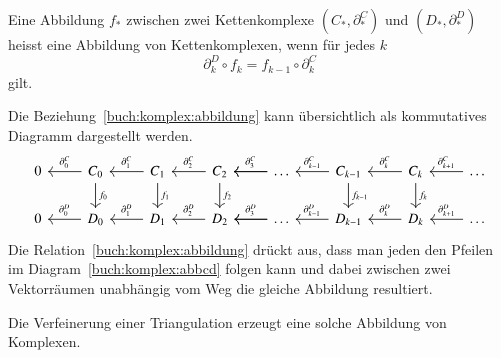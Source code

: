 \begin{definition}
Eine Abbildung $f_*$ zwischen zwei Kettenkomplexe $(C_*,\partial^C_*)$ und 
$(D_*,\partial^D_*)$ heisst eine Abbildung von Kettenkomplexen, wenn
für jedes $k$ 
\begin{equation}
\partial^D_k
\circ
f_{k}
=
f_{k-1}
\circ
\partial^C_k
\label{buch:komplex:abbildung}
\end{equation}
gilt.
\end{definition}

Die Beziehung~\eqref{buch:komplex:abbildung} kann übersichtlich als
kommutatives Diagramm dargestellt werden.
\begin{equation}
\begin{tikzcd}
0 
	& C_0 \arrow[l, "\partial_0^C" above]
		\arrow[d, "f_0"]
		& C_1 \arrow[l,"\partial_1^C" above]
			\arrow[d, "f_1"]
			& C_2 \arrow[l,"\partial_2^C" above]
				\arrow[d, "f_2"]
				& \dots \arrow[l]
					\arrow[l, "\partial_{3}^C" above]
					& C_{k-1}
						\arrow[l, "\partial_{k-1}^C" above]
						\arrow[d, "f_{k-1}"]
						& C_{k}\arrow[l, "\partial_{k}^C" above]
							\arrow[d, "f_{k}"]
							& \dots
								\arrow[l,"\partial_{k+1}^C" above]
\\
0 
	& D_0 \arrow[l, "\partial_0^D" above]
		& D_1 \arrow[l,"\partial_1^D" above]
			& D_2 \arrow[l,"\partial_2^D" above]
				& \dots \arrow[l]
					\arrow[l, "\partial_{3}^D" above]
					& D_{k-1}
						\arrow[l, "\partial_{k-1}^D" above]
						& D_{k}\arrow[l, "\partial_{k}^D" above]
							& \dots
								\arrow[l,"\partial_{k+1}^D" above]
\end{tikzcd}
\label{buch:komplex:abbcd}
\end{equation}
Die Relation~\eqref{buch:komplex:abbildung} drückt aus, dass man jeden
den Pfeilen im Diagram~\eqref{buch:komplex:abbcd} folgen kann und
dabei zwischen zwei Vektorräumen unabhängig vom Weg die gleiche Abbildung
resultiert.

Die Verfeinerung einer Triangulation erzeugt eine solche Abbildung von
Komplexen.



